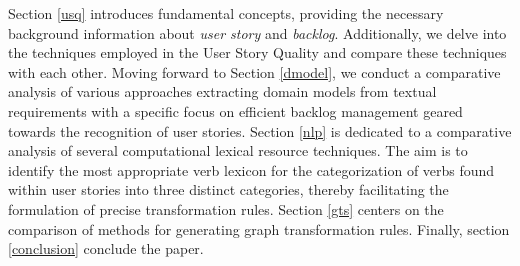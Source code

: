 Section \ref{usq} introduces fundamental concepts, providing the necessary background information about \emph{user story} and \emph{backlog}. Additionally, we delve into the techniques employed in the User Story Quality and compare these techniques with each other. Moving forward to Section \ref{dmodel}, we conduct a comparative analysis of various approaches extracting domain models from textual requirements with a specific focus on efficient backlog management geared towards the recognition of user stories. Section \ref{nlp} is dedicated to a comparative analysis of several computational lexical resource techniques. The aim is to identify the most appropriate verb lexicon for the categorization of verbs found within user stories into three distinct categories, thereby facilitating the formulation of precise transformation rules. Section \ref{gts} centers on the comparison of methods for generating graph transformation rules. Finally, section \ref{conclusion} conclude the paper. 
